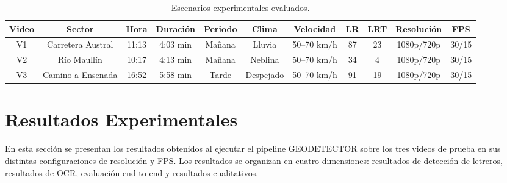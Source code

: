 \documentclass[runningheads]{llncs}
\begin{document}
\begin{table}[H]
\centering
\caption{Escenarios experimentales evaluados.}
\begin{tabular}{|c|c|c|c|c|c|c|c|c|c|c|}
\hline
\rowcolor{gray!20}
\textbf{Video} & \textbf{Sector} & \textbf{Hora} & \textbf{Duración} & \textbf{Periodo} & \textbf{Clima} & \textbf{Velocidad} & \textbf{LR} & \textbf{LRT} & \textbf{Resolución} & \textbf{FPS} \\
\hline
V1 & Carretera Austral & 11:13 & 4:03 min & Mañana & Lluvia    & 50--70 km/h & 87 & 23 & 1080p/720p & 30/15 \\
\hline
V2 & Río Maullín & 10:17 & 4:13 min & Mañana & Neblina   & 50--70 km/h & 34 & 4 & 1080p/720p & 30/15 \\
\hline
V3 & Camino a Ensenada & 16:52 & 5:58 min & Tarde  & Despejado & 50--70 km/h & 91 & 19 & 1080p/720p & 30/15 \\
\hline
\end{tabular}
\label{tab:escenarios}
\end{table}


\section{Resultados Experimentales}
En esta sección se presentan los resultados obtenidos al ejecutar el 
pipeline GEODETECTOR sobre los tres videos de prueba en sus distintas 
configuraciones de resolución y FPS. Los resultados se organizan en cuatro 
dimensiones: resultados de detección de letreros, resultados de OCR, evaluación end-to-end
y resultados cualitativos.



\end{document}
